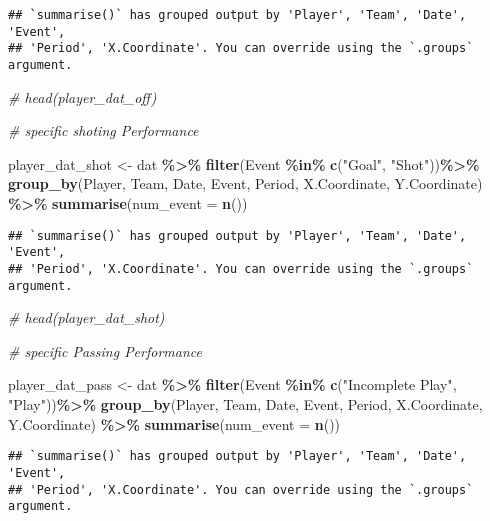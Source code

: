 \documentclass[
  a3paper,
]{article}
\newenvironment{Shaded}{\begin{snugshade}}{\end{snugshade}}
\newcommand{\AttributeTok}[1]{\textcolor[rgb]{0.13,0.29,0.53}{#1}}
\newcommand{\CommentTok}[1]{\textcolor[rgb]{0.56,0.35,0.01}{\textit{#1}}}
\newcommand{\FunctionTok}[1]{\textcolor[rgb]{0.13,0.29,0.53}{\textbf{#1}}}
\newcommand{\NormalTok}[1]{#1}
\newcommand{\OtherTok}[1]{\textcolor[rgb]{0.56,0.35,0.01}{#1}}
\newcommand{\SpecialCharTok}[1]{\textcolor[rgb]{0.81,0.36,0.00}{\textbf{#1}}}
\newcommand{\StringTok}[1]{\textcolor[rgb]{0.31,0.60,0.02}{#1}}
\begin{document}
\begin{verbatim}
## `summarise()` has grouped output by 'Player', 'Team', 'Date', 'Event',
## 'Period', 'X.Coordinate'. You can override using the `.groups` argument.
\end{verbatim}

\begin{Shaded}
\begin{Highlighting}[]
\CommentTok{\# head(player\_dat\_off)}


\CommentTok{\# specific shoting Performance}

\NormalTok{player\_dat\_shot }\OtherTok{\textless{}{-}}\NormalTok{  dat }\SpecialCharTok{\%\textgreater{}\%}
  \FunctionTok{filter}\NormalTok{(Event }\SpecialCharTok{\%in\%} \FunctionTok{c}\NormalTok{(}\StringTok{"Goal"}\NormalTok{, }\StringTok{"Shot"}\NormalTok{))}\SpecialCharTok{\%\textgreater{}\%} 
  \FunctionTok{group\_by}\NormalTok{(Player, Team, Date, Event, Period, X.Coordinate, Y.Coordinate) }\SpecialCharTok{\%\textgreater{}\%}
  \FunctionTok{summarise}\NormalTok{(}\AttributeTok{num\_event =} \FunctionTok{n}\NormalTok{())}
\end{Highlighting}
\end{Shaded}

\begin{verbatim}
## `summarise()` has grouped output by 'Player', 'Team', 'Date', 'Event',
## 'Period', 'X.Coordinate'. You can override using the `.groups` argument.
\end{verbatim}

\begin{Shaded}
\begin{Highlighting}[]
\CommentTok{\# head(player\_dat\_shot)}


\CommentTok{\# specific Passing Performance}

\NormalTok{player\_dat\_pass }\OtherTok{\textless{}{-}}\NormalTok{  dat }\SpecialCharTok{\%\textgreater{}\%}
  \FunctionTok{filter}\NormalTok{(Event }\SpecialCharTok{\%in\%} \FunctionTok{c}\NormalTok{(}\StringTok{"Incomplete Play"}\NormalTok{, }\StringTok{"Play"}\NormalTok{))}\SpecialCharTok{\%\textgreater{}\%} 
  \FunctionTok{group\_by}\NormalTok{(Player, Team, Date, Event, Period, X.Coordinate, Y.Coordinate) }\SpecialCharTok{\%\textgreater{}\%}
  \FunctionTok{summarise}\NormalTok{(}\AttributeTok{num\_event =} \FunctionTok{n}\NormalTok{())}
\end{Highlighting}
\end{Shaded}

\begin{verbatim}
## `summarise()` has grouped output by 'Player', 'Team', 'Date', 'Event',
## 'Period', 'X.Coordinate'. You can override using the `.groups` argument.
\end{verbatim}
\end{document}
